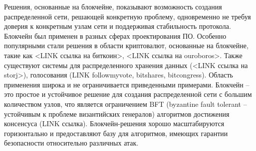 \documentclass[]{itmo-student-thesis}
\begin{document}





\tableofcontents

\startprefacepage

Решения, основанные на блокчейне, показывают возможность создания
распределенной сети, решающей конкретную проблему, одновременно не
требуя доверия к конкретным узлам сети и поддерживая стабильность
протокола. Блокчейн был применен в разных
сферах проектирования ПО. Особенно популярными стали решения в области
криптовалют, основанные на блокчейне, такие как <LINK ссылка на
биткоин>, <LINK ссылка на ouroboros>. Также существуют системы для
распределенного хранения данных (<LINK ссылка на storj>), голосования
(LINK followmyvote, bitshares, bitcongress). Область применения широка
и не ограничивается приведенными примерами. Блокчейн -- это простое и
устойчивое решение для создания распределенной сети с большим
количеством узлов, что является ограничением BFT (byzantine fault
tolerant -- устойчивым к проблеме византийских генералов) алгоритмов
достижения консенсуса (LINK ссылка). Блокчейн-решения хорошо
масштабируются горизонтально и предоставляют базу для алгоритмов,
имеющих гарантии безопасности относительно различных атак.
\end{document}
